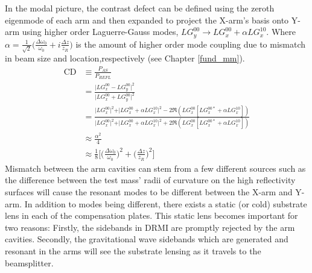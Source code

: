 	In the modal picture, the contrast defect can be defined using the zeroth eigenmode of each arm and then expanded to project the X-arm's basis onto Y-arm using higher order Laguerre-Gauss modes, $LG^{00}_y \rightarrow  LG^{00}_x + \alpha LG^{10}_x$. Where $\alpha = \frac{1}{\sqrt{2}} \big(\frac{\Delta \omega_{0}}{\omega_{0}} + i \frac{\Delta z }{z_R}\big)$ is the amount of higher order mode coupling due to mismatch in beam size and location,respectively (see Chapter \ref{fund_mm}).
	\begin{equation}\label{CD_mode}
	\begin{aligned}
	\text{CD} 	&\equiv \frac{P_{AS}}{P_{REFL}} \\
				&= \frac{\vert LG^{00}_x - LG^{00}_y \vert^2}{\vert LG^{00}_x + LG^{00}_y \vert^2}\\
				&= \frac{\vert LG^{00}_x \vert^2 + \vert LG^{00}_x + \alpha LG^{10}_x \vert^2 - 2\Re(LG^{00}_x [LG^{00*}_x + \alpha LG^{10}_x ])}{\vert LG^{00}_x \vert^2 + \vert LG^{00}_x + \alpha LG^{10}_x \vert^2 + 2\Re(LG^{00}_x [LG^{00*}_x + \alpha LG^{10}_x ])}\\
				&\approx \frac{\alpha^2}{4}\\
				&\approx \frac{1}{8} \bigg[ \bigg(\frac{\Delta\omega_{0}}{\omega_{0}} \bigg)^2+  \bigg(\frac{ \Delta z }{z_R}\bigg)^2 \bigg]
	\end{aligned}
	\end{equation}
	Mismatch between the arm cavities can stem from a few different sources such as the difference between the test mass' radii of curvature on the high reflectivity surfaces will cause the resonant modes to be different between the X-arm and Y-arm.  In addition to modes being different, there exists a static (or cold) substrate lens in each of the compensation plates.  This static lens becomes important for two reasons: Firstly, the sidebands in DRMI are promptly rejected by the arm cavities. Secondly, the gravitational wave sidebands which are generated and resonant in the arms will see the substrate lensing as it travels to the beamsplitter.
	
